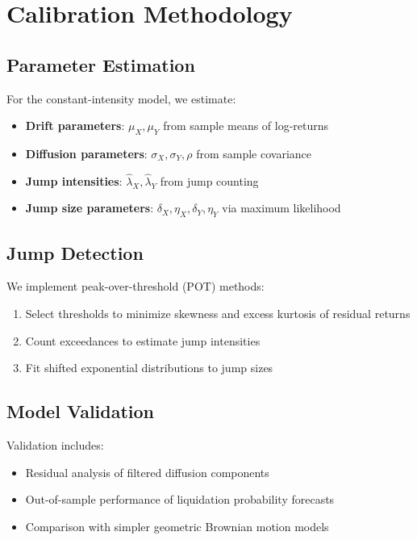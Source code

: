 \documentclass{article}
\theoremstyle{definition}
\begin{document}
\section{Calibration Methodology}

\subsection{Parameter Estimation}

For the constant-intensity model, we estimate:
\begin{itemize}
    \item \textbf{Drift parameters}: $\mu_X, \mu_Y$ from sample means of log-returns
    \item \textbf{Diffusion parameters}: $\sigma_X, \sigma_Y, \rho$ from sample covariance
    \item \textbf{Jump intensities}: $\hat\lambda_X, \hat\lambda_Y$ from jump counting
    \item \textbf{Jump size parameters}: $\delta_X, \eta_X, \delta_Y, \eta_Y$ via maximum likelihood
\end{itemize}

\subsection{Jump Detection}

We implement peak-over-threshold (POT) methods:
\begin{enumerate}
    \item Select thresholds to minimize skewness and excess kurtosis of residual returns
    \item Count exceedances to estimate jump intensities
    \item Fit shifted exponential distributions to jump sizes
\end{enumerate}

\subsection{Model Validation}

Validation includes:
\begin{itemize}
    \item Residual analysis of filtered diffusion components
    \item Out-of-sample performance of liquidation probability forecasts
    \item Comparison with simpler geometric Brownian motion models
\end{itemize}
\end{document}
